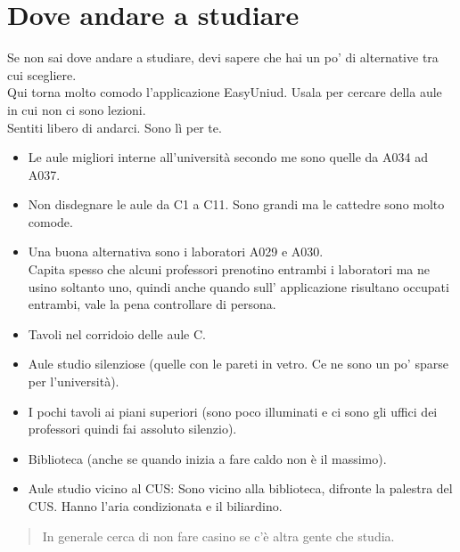 \documentclass[18pt]{extarticle}
\begin{document}
\section{Dove andare a studiare}
Se non sai dove andare a studiare, devi sapere che hai un po' di alternative tra cui scegliere.\\
Qui torna molto comodo l'applicazione EasyUniud. Usala per cercare della aule in cui non ci sono lezioni.\\
Sentiti libero di andarci. Sono lì per te.
\begin{itemize}
\item Le aule migliori interne all'università secondo me sono quelle da A034 ad A037.
\item Non disdegnare le aule da C1 a C11. Sono grandi ma le cattedre sono molto comode.
\item Una buona alternativa sono i laboratori A029 e A030.\\
	Capita spesso che alcuni professori prenotino entrambi i laboratori ma ne usino soltanto uno, quindi anche quando sull' applicazione risultano occupati entrambi, vale la pena controllare di persona.
\item Tavoli nel corridoio delle aule C.
\item Aule studio silenziose (quelle con le pareti in vetro. Ce ne sono un po' sparse per l'università).
\item I pochi tavoli ai piani superiori (sono poco illuminati e ci sono gli uffici dei professori quindi fai assoluto silenzio).
\item Biblioteca (anche se quando inizia a fare caldo non è il massimo).
\item Aule studio vicino al CUS: Sono vicino alla biblioteca, difronte la palestra del CUS. Hanno l'aria condizionata e il biliardino.
\end{itemize}
\begin{quote}
In generale cerca di non fare casino se c'è altra gente che studia.
\end{quote}
\end{document}
